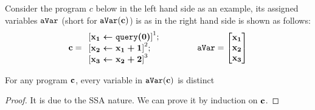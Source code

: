 \documentclass[a4paper,11pt]{article}
\begin{document}
Consider the program $c$ below in the left hand side as an example, its assigned variables $\mathtt{aVar}$ (short for $\mathtt{aVar}({\boldsymbol{\mathbf{c}}})$) is as in the right hand side is shown as follows:
$$
\ssa{c} = 
\begin{array}{l}
\left[\ssa{\assign {x_1} {\query(0)}}		\right]^1;
\\
\left[\ssa{\assign {x_2} {x_1 + 1}}		\right]^2;
\\
\left[\ssa{\assign {x_3} {x_2 + 2}}		\right]^3
\end{array}
~~~~~~~~~~~~
\avar = \left [ 
\begin{matrix}
\ssa{x_1} \\
\ssa{x_2} \\
\ssa{x_3} \\
\end{matrix} \right ]
$$
%
\begin{lem}
For any program ${\boldsymbol{\mathbf{c}}}$, every variable in $\mathtt{aVar}({\boldsymbol{\mathbf{c}}})$ is distinct
\end{lem}
\begin{proof}
 It is due to the SSA nature. We can prove it by induction on ${\boldsymbol{\mathbf{c}}}$.
\end{proof}
\end{document}
